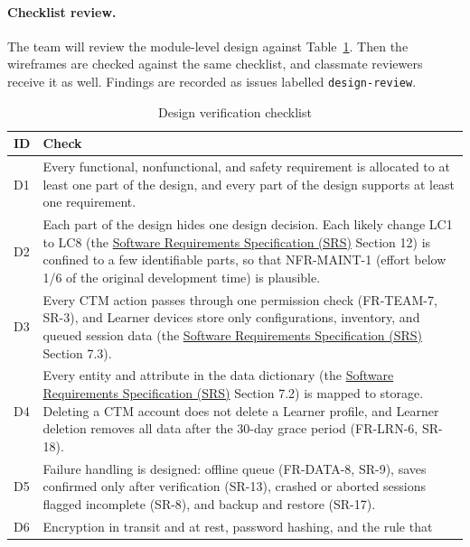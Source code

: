 \documentclass[12pt, titlepage]{article}
\newcommand{\srsreq}[1]{#1}
\begin{document}
\paragraph{Checklist review.} The team will review the module-level
design against Table~\ref{tab:design-checklist}. Then the
wireframes are checked against the same checklist, and classmate reviewers receive it as
well. Findings are recorded as issues labelled \texttt{design-review}.

\begin{table}[htbp]
\centering\small
\caption{Design verification checklist}
\label{tab:design-checklist}
\renewcommand{\arraystretch}{1.2}
\begin{tabularx}{\textwidth}{l >{\raggedright\arraybackslash}X}
\toprule
\textbf{ID} & \textbf{Check}\\
\midrule
D1 & Every functional, nonfunctional, and safety requirement is allocated to at
least one part of the design, and every part of the design supports at least
one requirement.\\
D2 & Each part of the design hides one design decision. Each likely change LC1
to LC8 (the \href{https://github.com/meena-alomran/game-n-grow/blob/main/pdfs/SRS-IEEE/SRS.pdf}{Software Requirements Specification (SRS)} Section 12) is confined to a few identifiable parts, so that
\srsreq{NFR-MAINT-1} (effort below 1/6 of the original development time) is
plausible.\\
D3 & Every CTM action passes through one permission check (\srsreq{FR-TEAM-7}, \srsreq{SR-3}),
and Learner devices store only configurations, inventory, and queued session
data (the \href{https://github.com/meena-alomran/game-n-grow/blob/main/pdfs/SRS-IEEE/SRS.pdf}{Software Requirements Specification (SRS)} Section 7.3).\\
D4 & Every entity and attribute in the data dictionary (the \href{https://github.com/meena-alomran/game-n-grow/blob/main/pdfs/SRS-IEEE/SRS.pdf}{Software Requirements Specification (SRS)} Section 7.2) is
mapped to storage. Deleting a CTM account does not delete a Learner profile,
and Learner deletion removes all data after the 30-day grace period
(\srsreq{FR-LRN-6}, \srsreq{SR-18}).\\
D5 & Failure handling is designed: offline queue (\srsreq{FR-DATA-8}, \srsreq{SR-9}), saves
confirmed only after verification (\srsreq{SR-13}), crashed or aborted sessions flagged
incomplete (\srsreq{SR-8}), and backup and restore (\srsreq{SR-17}).\\
D6 & Encryption in transit and at rest, password hashing, and the rule that

\end{tabularx}
\end{table}
\end{document}
